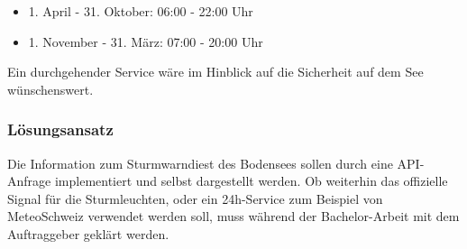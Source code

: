 \begin{itemize}  
\item 1. April - 31. Oktober: 06:00 - 22:00 Uhr 
\item 1. November - 31. März: 07:00 - 20:00 Uhr
\end{itemize}

Ein durchgehender Service wäre im Hinblick auf die Sicherheit auf dem See wünschenswert.

\subsubsection*{Lösungsansatz}
Die Information zum Sturmwarndiest des Bodensees sollen durch eine API-Anfrage implementiert und selbst dargestellt werden. Ob weiterhin das offizielle Signal für die Sturmleuchten, oder ein 24h-Service zum Beispiel von MeteoSchweiz verwendet werden soll, muss während der Bachelor-Arbeit mit dem Auftraggeber geklärt werden.



